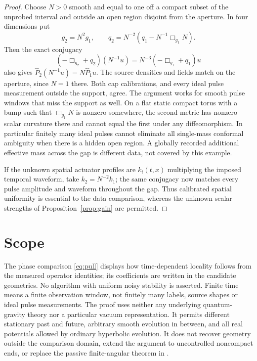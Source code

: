 \documentclass[11pt]{article}
\numberwithin{equation}{section}
\begin{document}
\begin{proof}
Choose \(N>0\) smooth and equal to one off a compact subset of the unprobed interval and outside an open region disjoint from the aperture. In four dimensions put
\[
 g_2=N^2g_1,\qquad q_2=N^{-2}(q_1-N^{-1}\Box_{g_1}N).
\]
Then the exact conjugacy
\[
 (-\Box_{g_2}+q_2)(N^{-1}u)=N^{-3}(-\Box_{g_1}+q_1)u
\]
also gives \(\widehat P_2(N^{-1}u)=N\widehat P_1u\). The source densities and fields match on the aperture, since \(N=1\) there. Both cap calibrations, and every ideal pulse measurement outside the support, agree. The argument works for smooth pulse windows that miss the support as well. On a flat static compact torus with a bump such that \(\Box_{g_1}N\) is nonzero somewhere, the second metric has nonzero scalar curvature there and cannot equal the first under any diffeomorphism. In particular finitely many ideal pulses cannot eliminate all single-mass conformal ambiguity when there is a hidden open region. A globally recorded additional effective mass across the gap is different data, not covered by this example.

If the unknown spatial actuator profiles are \(k_i(t,x)\) multiplying the imposed temporal waveform, take \(k_2=N^{-2}k_1\); the same conjugacy now matches every pulse amplitude and waveform throughout the gap. Thus calibrated spatial uniformity is essential to the data comparison, whereas the unknown scalar strengths of Proposition~\ref{prop:gain} are permitted.
\end{proof}

\section{Scope}

The phase comparison \eqref{eq:pull} displays how time-dependent locality follows from the measured operator identities; its coefficients are written in the candidate geometries. No algorithm with uniform noisy stability is asserted. Finite time means a finite observation window, not finitely many labels, source shapes or ideal pulse measurements. The proof uses neither any underlying quantum-gravity theory nor a particular vacuum representation. It permits different stationary past and future, arbitrary smooth evolution in between, and all real potentials allowed by ordinary hyperbolic evolution. It does not recover geometry outside the comparison domain, extend the argument to uncontrolled noncompact ends, or replace the passive finite-angular theorem in \cite{Archive33}.
\end{document}
